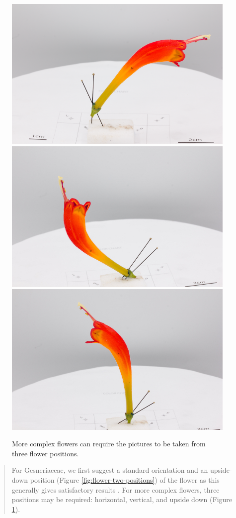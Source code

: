 \documentclass[
]{book}
\begin{document}
\begin{figure}

{\centering \includegraphics[width=0.33\linewidth]{Figures/flowerplacement_1} \includegraphics[width=0.33\linewidth]{Figures/flowerplacement_2} \includegraphics[width=0.33\linewidth]{Figures/flowerplacement_3} 

}

\caption{More complex flowers can require the pictures to be taken from three flower positions.}\label{fig:flower-three-positions}
\end{figure}

\begin{quote}
For Gesneriaceae, we first suggest a standard orientation and an
upside-down position (Figure \ref{fig:flower-two-positions}) of the flower as this generally gives satisfactory results . For more complex flowers, three positions may be required: horizontal, vertical, and upside down (Figure
\ref{fig:flower-three-positions}).
\end{quote}
\end{document}
